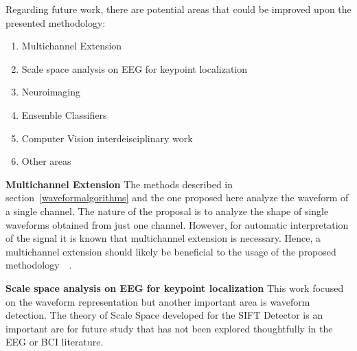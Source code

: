 
\vspace{7pt}

Regarding future work, there are potential areas that could be improved upon the presented methodology:

\begin{enumerate}
\item Multichannel Extension
\item Scale space analysis on EEG for keypoint localization
\item Neuroimaging
\item Ensemble Classifiers
\item Computer Vision interdeisciplinary work
\item Other areas
\end{enumerate}

\textbf{Multichannel Extension}
The methods described in section~\ref{waveformalgorithms} and the one proposed here analyze the waveform of a single channel.
The nature of the proposal is to analyze the shape of single waveforms obtained from just one channel.  %
However, for automatic interpretation of the signal it is known that multichannel extension is necessary.  Hence, a multichannel extension should likely be beneficial to the usage of the proposed methodology~~\cite{Gribonval2008}.

\textbf{Scale space analysis on EEG for keypoint localization}
This work focused on the waveform representation but another important area is waveform detection.  The theory of Scale Space developed for the SIFT Detector is an important are for future study that has not been explored thoughtfully in the EEG or BCI literature.


